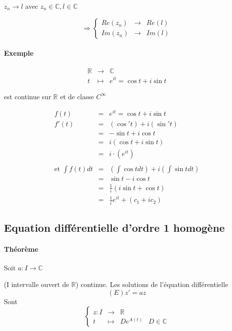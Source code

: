 $z_n \rightarrow l$ avec $z_n \in \mathbb{C}, l \in \mathbb{C}$

\[\Rightarrow \left\{\begin{array}{rcl}
	Re(z_n) &\rightarrow& Re(l) \\
	Im(z_n) &\rightarrow& Im(l)\end{array}\right.\]

\paragraph{Exemple}

\[\begin{array}{rcl}
	\mathbb{R} &\rightarrow& \mathbb{C} \\
	t &\mapsto& e^{it} = \cos t + i \sin t
\end{array}\]

est continue sur $\mathbb{R}$ et de classe $C^\infty$

\[\begin{array}{rcl}
	f(t) &=& e^{it} = \cos t + i \sin t \\
	f'(t) &=& (\cos 't) + i(\sin 't) \\
		&=& -\sin t + i \cos t \\
		&=& i(\cos t + i \sin t) \\
		&=& i\cdot(e^{it}) \\
							\\
	\text{et } \int f(t)dt &=& (\int\cos t dt) + i (\int \sin t dt) \\
		&=& \sin t - i \cos t \\
		&=&  \frac{1}{i}(i \sin t + \cos t) \\
		&=& \frac{1}{i} e^{it} + (c_1 + i c_2)
\end{array}\]

\subsection{Equation différentielle d'ordre 1 homogène}

\paragraph{Théorème} Soit $a : I \rightarrow \mathbb{C}$

(I intervalle ouvert de $\mathbb{R}$) continue. Les solutions de l'équation différentielle \[(E) z' = az\]
Sont \[\left\{\begin{array}{rclr}
z : I & \rightarrow& \mathbb{R} \\
t &\mapsto & De^{A(t)} & D \in \mathbb{C}\end{array}\right.\]

